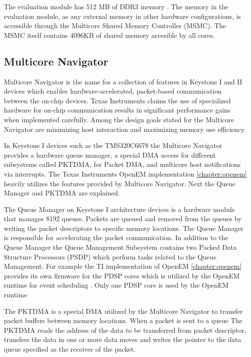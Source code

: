 The evaluation module has 512 MB of DDR3 memory \cite{evmref}. The memory in
the evaluation module, as any external memory in other hardware configurations,
is accessible through the Multicore Shared Memory Controller (MSMC). The MSMC
itself contains 4096KB of shared memory accesible by all cores.

\subsection{Multicore Navigator} \label{subsec:multicorenav} Multicore
Navigator is the name for a collection of features in Keystone I and II devices
which enables hardware-accelerated, packet-based communication between the
on-chip devices. Texas Instruments claims the use of specialized hardware for
on-chip communication results in significant performance gains when implemented
carefully. Among the design goals stated for the Multicore Navigator are
minimizing host interaction and maximizing memory use efficiency.
\cite{navigator}

In Keystone I devices such as the TMS320C6678 the Multicore Navigator provides
a hardware queue manager, a special DMA access for different subsystems called
PKTDMA, for Packet DMA, and multicore host notifications via interrupts.
\cite{navigator} The Texas Instruments OpenEM implementation
\ref{chapter:openem} heavily utilizes the features provided by Multicore
Navigator. Next the Queue Manager and PKTDMA are explained.

The Queue Manager on Keystone I architecture devices is a hardware module that
manages 8192 queues. Packets are queued and removed from the queues by writing
the packet descriptors to specific memory locations. The Queue Manager is
responsible for accelerating the packet communication. In addition to the Queue
Manager the Queue Management Subsystem contains two Packed Data Structure
Processors (PSDP) which perform tasks related to the Queue Management.
\cite{navigator} For example the TI implementation of OpenEM
\ref{chapter:openem} provides its own firmware for the PDSP cores which is
utilized by the OpenEM runtime for event scheduling \cite{openemwhite}. Only
one PDSP core is used by the OpenEM runtime

The PKTDMA is a special DMA utilized by the Multicore Navigator to transfer
packet buffers between memory locations. When a packet is sent to a queue The
PKTDMA reads the address of the data to be transferred from packet descriptor,
transfers the data in one or more data moves and writes the pointer to the data
queue specified as the receiver of the packet. \cite{navigator}

